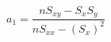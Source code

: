 \documentclass[12pt]{article}
\begin{document}
$ \begin{equation*}a_1=\dfrac{nS_{xy}-S_xS_y}{nS_{xx}-(S_x)^2}\end{equation*} $
\end{document}

